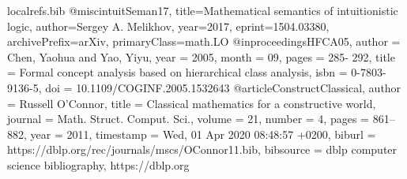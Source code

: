 \begin{filecontents}{localrefs.bib}
@misc{intuitSeman17,
      title={Mathematical semantics of intuitionistic logic}, 
      author={Sergey A. Melikhov},
      year={2017},
      eprint={1504.03380},
      archivePrefix={arXiv},
      primaryClass={math.LO}
}
@inproceedings{HFCA05,
author = {Chen, Yaohua and Yao, Yiyu},
year = {2005},
month = {09},
pages = {285- 292},
title = {Formal concept analysis based on hierarchical class analysis},
isbn = {0-7803-9136-5},
doi = {10.1109/COGINF.2005.1532643}
}
@article{ConstructClassical,
  author    = {Russell O'Connor},
  title     = {Classical mathematics for a constructive world},
  journal   = {Math. Struct. Comput. Sci.},
  volume    = {21},
  number    = {4},
  pages     = {861--882},
  year      = {2011},
  timestamp = {Wed, 01 Apr 2020 08:48:57 +0200},
  biburl    = {https://dblp.org/rec/journals/mscs/OConnor11.bib},
  bibsource = {dblp computer science bibliography, https://dblp.org}
}
\end{filecontents}

\documentclass[]{llncs}
%

